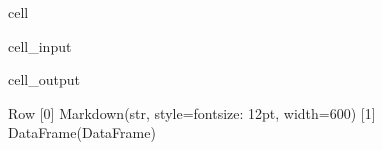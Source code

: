 \documentclass[letterpaper,10pt,english]{jupyterBook}
\begin{document}
\begin{sphinxuseclass}{cell}
\begin{sphinxVerbatimInput}
\begin{sphinxuseclass}{cell_input}
\begin{sphinxVerbatim}[commandchars=\\\{\}]
        
   
  
   
\end{sphinxVerbatim}

\end{sphinxuseclass}\end{sphinxVerbatimInput}
\begin{sphinxVerbatimOutput}

\begin{sphinxuseclass}{cell_output}
\begin{sphinxVerbatim}[commandchars=\\\{\}]
Row
    [0] Markdown(str, style=\PYGZob{}\PYGZsq{}font\PYGZhy{}size\PYGZsq{}: \PYGZsq{}12pt\PYGZsq{}\PYGZcb{}, width=600)
    [1] DataFrame(DataFrame)
\end{sphinxVerbatim}

\end{sphinxuseclass}\end{sphinxVerbatimOutput}

\end{sphinxuseclass}
\end{document}
